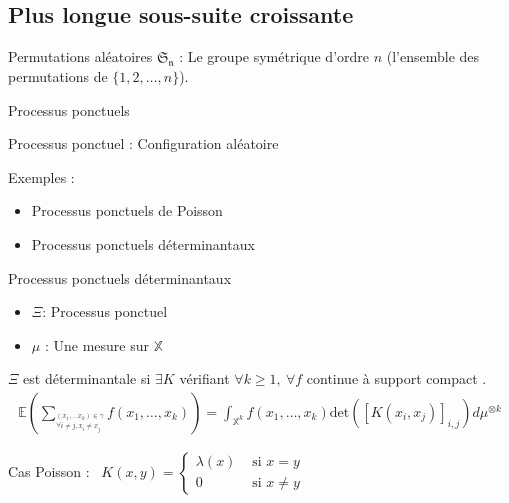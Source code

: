 \documentclass[french]{beamer}
\begin{document}
\subsection{Plus longue sous-suite croissante}
\begin{frame}{Permutations aléatoires}
$\mathfrak{S_n}$ : Le groupe symétrique d'ordre $n$ (l'ensemble des permutations de $\{1,2,\dots,n\}$).
\\ 

\end{frame}
\begin{frame}{Processus ponctuels} 
\begin{definition}
Processus ponctuel : Configuration aléatoire
\end{definition}
Exemples :
\begin{itemize}
\item Processus ponctuels de Poisson 
\item Processus ponctuels déterminantaux 
\end{itemize}
\end{frame}
\begin{frame}{Processus ponctuels déterminantaux}

\begin{itemize}

\item $\Xi$: Processus ponctuel
 \item $\mu$ : Une mesure sur $\mathbb{X}$
\end{itemize}

\begin{definition}[DPP]
$\Xi$ est déterminantale si $\exists K$ vérifiant  $\forall k\geq 1,\  \forall f $ continue à support compact . 
  \begin{align*}
  \mathbb{E}(\sum_{{}_{\forall i\neq j, x_i \neq x_j }^{(x_1,...x_k)\in \gamma}} f(x_1,\dots,x_k))=\int_{\mathbb{X}^k}f(x_1,\dots,x_k)\mathrm{det}([K(x_i,x_j)]_{ i,j})d\mu^{\otimes k}
  \end{align*}

\end{definition}
Cas Poisson : \ 
$K(x,y)=\begin{cases}
\lambda(x) & \text{ si } x=y  \\ 
0 & \text{ si } x\neq y 
\end{cases}
$      \end{frame}
\end{document}
